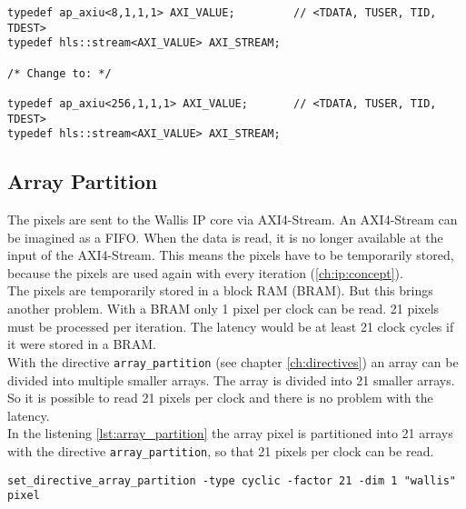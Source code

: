 \begin{minipage}{\textwidth}
\begin{lstlisting}[style=CStyle, caption=Calculation of the division for the Wallis filter, label=lst:division]
typedef ap_axiu<8,1,1,1> AXI_VALUE;			// <TDATA, TUSER, TID, TDEST>
typedef hls::stream<AXI_VALUE> AXI_STREAM;

/* Change to: */

typedef ap_axiu<256,1,1,1> AXI_VALUE;		// <TDATA, TUSER, TID, TDEST>
typedef hls::stream<AXI_VALUE> AXI_STREAM;
\end{lstlisting}
\end{minipage}

\subsection{Array Partition}
The pixels are sent to the Wallis IP core via AXI4-Stream. An AXI4-Stream can be imagined as a FIFO. When the data is read, it is no longer available at the input of the AXI4-Stream. This means the pixels have to be temporarily stored, because the pixels are used again with every iteration (\ref{ch:ip:concept}). \\
The pixels are temporarily stored in a block RAM (BRAM). But this brings another problem. With a BRAM only 1 pixel per clock can be read. 21 pixels must be processed per iteration. The latency would be at least 21 clock cycles if it were stored in a BRAM. \\
With the directive \texttt{array\_partition} (see chapter \ref{ch:directives})
an array can be divided into multiple smaller arrays. The array is divided into 21 smaller arrays. So it is possible to read 21 pixels per clock and there is no problem with the latency. \\
In the listening \ref{lst:array_partition} the array pixel is partitioned into 21 arrays with the directive \texttt{array\_partition}, so that 21 pixels per clock can be read. 
\begin{minipage}{\textwidth}
\begin{lstlisting}[style=TextStyle, caption=Set directive array\_partition, label=lst:array_partition]
set_directive_array_partition -type cyclic -factor 21 -dim 1 "wallis" pixel
\end{lstlisting}
\end{minipage}



